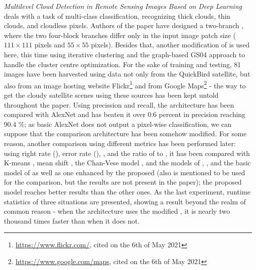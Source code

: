 \textit{Multilevel Cloud Detection in Remote Sensing Images Based on Deep Learning} deals with a task of multi-class classification, recognizing thick clouds, thin clouds, and cloudless pixels. Authors of the paper have designed a two-branch , where the two four-block branches differ only in the input image patch size ($111 \times 111$ pixels and $55 \times 55$ pixels). Besides that, another modification of  \cite{slic} is used here, this time using iterative clustering and the graph-based GS04 approach \cite{gs04} to handle the cluster centre optimization. For the sake of training and testing, 81  images have been harvested using data not only from the QuickBird satellite, but also from an image hosting website Flickr\footnote{\url{https://www.flickr.com/}, cited on the 6th of May 2021} and from Google Maps\footnote{\url{https://www.google.com/maps}, cited on the 6th of May 2021} - the way to get the cloudy satellite scenes using these sources has been kept untold throughout the paper. Using precission and recall, the architecture has been compared with AlexNet\cite{cnn-classification} and has beaten it over 0.6 percent in precision reaching 90.4 \%; as basic AlexNet does not output a pixel-wise classification, we can suppose that the comparison architecture has been somehow modified. For some reason, another comparison using different metrics has been performed later: using right rate (), error rate (), , and the ratio of  to , it has been compared with K-means \cite{k-means}, mean shift \cite{mean-shift}, the Chan-Vese model \cite{chan-vese}, and the models of \cite{cloud-detection-progressive-refinement}, \cite{cloud-detection-scene-learning}, and the basic model of \cite{saliency-detection-dl} as well as one enhanced by the proposed  (also \cite{multiphase-mumford-shah} is mentioned to be used for the comparison, but the results are not present in the paper); the proposed model reaches better results than the other ones. As the last experiment, runtime statistics of three situations are presented, showing a result beyond the realm of common reason - when the architecture uses the modified , it is nearly two thousand times faster than when it does not.


